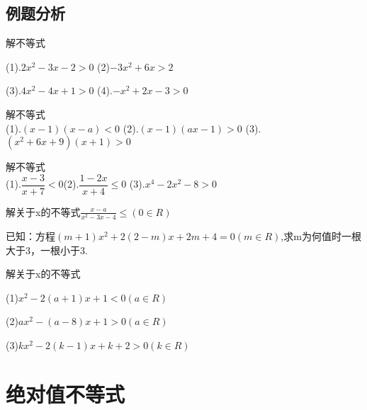 \section{例题分析}
\begin{example}解不等式 \par
(1).$2x^2-3x-2>0$   \hfil  (2)$-3x^2+6x>2$ \par
\vspace{2cm}
(3).$4x^2-4x+1>0$   \hfil  (4).$-x^2+2x-3>0$\\
\vspace{2cm}
\end{example}
\begin{example}解不等式\\
	(1).$(x-1)(x-a)<0$     \hfil   (2).$(x-1)(ax-1)>0$ \hfil  (3).$(x^2+6x+9)(x+1)>0$\\
	\vspace{2cm}
\end{example}
\begin{example}解不等式\\
	(1).$\dfrac{x-3}{x+7}<0$\hfil   (2).$\dfrac{1-2x}{x+4}\leq 0$ \hfil (3).$x^4-2x^2-8>0$\\
	\vspace{2cm}
\end{example}
\begin{example}解关于x的不等式$\frac{x-a}{x^2-3x-4}\leq(0\in R)$\\
	\vspace{2cm}
\end{example}
\begin{example}已知：方程$(m+1)x^2+2(2-m)x+2m+4=0(m\in R)$,求m为何值时一根大于3，一根小于3.\\
	\vspace{2cm}
\end{example}
\begin{example}解关于x的不等式\par
	(1)$x^2-2(a+1)x+1<0(a\in R)$\par
	\vspace{2cm}
	(2)$ax^2-(a-8)x+1>0(a\in R)$\par
	\vspace{2cm}
	(3)$kx^2-2(k-1)x+k+2>0(k\in R)$
	\vspace{2cm}
\end{example}
\chapter{绝对值不等式}
